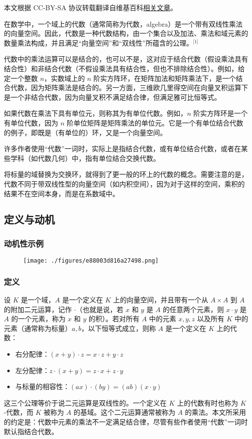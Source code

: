 
本文根据 CC-BY-SA 协议转载翻译自维基百科\href{https://en.wikipedia.org/wiki/Algebra_over_a_field}{相关文章}。

在数学中，一个域上的代数（通常简称为代数，algebra）是一个带有双线性乘法的向量空间。因此，代数是一种代数结构，由一个集合以及加法、乘法和域元素的数量乘法构成，并且满足“向量空间”和“双线性”所蕴含的公理。\(^\text{[1]}\)

代数中的乘法运算可以是结合的，也可以不是，这对应于结合代数（假设乘法具有结合性）和非结合代数（不假设乘法具有结合性，但也不排除结合性）。例如，给定一个整数 $n$，实数域上的 $n$ 阶实方阵环，在矩阵加法和矩阵乘法下，是一个结合代数，因为矩阵乘法是结合的。另一方面，三维欧几里得空间在向量叉积运算下是一个非结合代数，因为向量叉积不满足结合律，但满足雅可比恒等式。

如果代数在乘法下具有单位元，则称其为有单位代数。例如，$n$ 阶实方阵环是一个有单位代数，因为 $n$ 阶单位矩阵是矩阵乘法的单位元。它是一个有单位结合代数的例子，即既是（有单位的）环，又是一个向量空间。

许多作者使用“代数”一词时，实际上是指结合代数，或有单位结合代数，或者在某些学科（如代数几何）中，指有单位结合交换代数。

将标量的域替换为交换环，就得到了更一般的环上的代数的概念。需要注意的是，代数不同于带双线性型的向量空间（如内积空间），因为对于这样的空间，乘积的结果不在空间本身，而是在系数域中。
\subsection{定义与动机}
\subsubsection{动机性示例}
\begin{figure}[ht]
\centering
\texttt{[image: ./figures/e88003d816a27498.png]}
\caption{} \label{fig_YSds_1}
\end{figure}
\subsubsection{定义}
设 $K$ 是一个域，$A$ 是一个定义在 $K$ 上的向量空间，并且带有一个从 $A \times A$ 到 $A$ 的附加二元运算，记作 $\cdot$（也就是说，若 $x$ 和 $y$ 是 $A$ 的任意两个元素，则 $x \cdot y$ 是 $A$ 的一个元素，称为 $x$ 和 $y$ 的积）。若对所有 $A$ 中的元素 $x, y, z$ 以及所有 $K$ 中的元素（通常称为标量）$a, b$，以下恒等式成立，则称 $A$ 是一个定义在 $K$ 上的代数：
\begin{itemize}
\item 右分配律：$(x + y) \cdot z = x \cdot z + y \cdot z$
\item 左分配律：$z \cdot (x + y) = z \cdot x + z \cdot y$
\item 与标量的相容性：$(a x) \cdot (b y) = (ab)(x \cdot y)$
\end{itemize}
这三个公理等价于说二元运算是双线性的。一个定义在 $K$ 上的代数有时也称为 $K$-代数，而 $K$ 被称为 $A$ 的基域。这个二元运算通常被称为 $A$ 的乘法。本文所采用的约定是：代数中元素的乘法不一定满足结合律，尽管有些作者使用“代数”一词时默认指结合代数。

